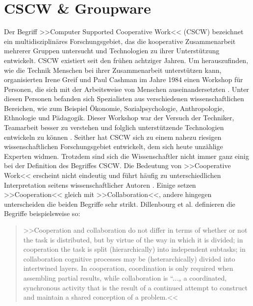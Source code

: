 \chapter{CSCW \& Groupware}\label{ch:CSCWDesign}

	Der Begriff >>Computer Supported Cooperative Work<< (\ac{CSCW}) bezeichnet ein multidisziplinäres Forschungsgebiet, das die kooperative Zusammenarbeit mehrerer Gruppen untersucht und Technologien zu ihrer Unterstützung entwickelt. \ac{CSCW} existiert seit den frühen achtziger Jahren. Um herauszufinden, wie die Technik Menschen bei ihrer Zusammenarbeit unterstützen kann, organisierten Irene Greif und Paul Cashman im Jahre 1984 einen Workshop für Personen, die sich mit der Arbeitsweise von Menschen auseinandersetzten \citep{Grudin:1994}. Unter diesen Personen befanden sich Spezialisten aus verschiedenen wissenschaftlichen Bereichen, wie zum Beispiel Ökonomie, Sozialpsychologie, Anthropologie, Ethnologie und Pädagogik. Dieser Workshop war der Versuch der Techniker, Teamarbeit besser zu verstehen und folglich unterstützende Technologien entwickeln zu können \citep{Grudin:1994, Rama:2006p245}. Seither hat \ac{CSCW} sich zu einem nahezu riesigen wissenschaftlichen Forschungsgebiet entwickelt, dem sich heute unzählige Experten widmen. Trotzdem sind sich die Wissenschaftler nicht immer ganz einig bei der Definition des Begriffes \ac{CSCW}. Die Bedeutung von >>Cooperative Work<< erscheint nicht eindeutig und führt häufig zu unterschiedlichen Interpretation seitens wissenschaftlicher Autoren \citep{Gerlicher:2007p241}. Einige setzen >>Cooperation<< gleich mit >>Collaboration<<, andere hingegen unterscheiden die beiden Begriffe sehr strikt. Dillenbourg et al. definieren die Begriffe beispielsweise so: 
	
	\medskip\begin{quote}{>>Cooperation and collaboration do not differ in terms of whether or not the task is distributed, but by virtue of the way in which it is divided; in cooperation the task is split (hierarchically) into independent subtasks; in collaboration cognitive processes may be (heterarchically) divided into intertwined layers. In cooperation, coordination is only required when assembling partial results, while collaboration is “...„ a coordinated, synchronous activity that is the result of a continued attempt to construct and maintain a shared conception of a problem.<<} \begin{flushright}\citep{Dillenbourg:1995} \end{flushright}\end{quote}
	
